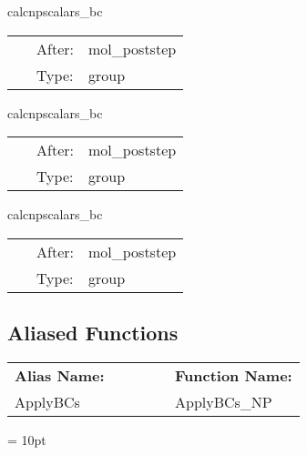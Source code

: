 \vspace{5mm}


\hspace{5mm} calcnpscalars\_bc 

\hspace{5mm}{\it boundary conditions } 


\hspace{5mm}

 \begin{tabular*}{160mm}{cll} 
~ & After:  & mol\_poststep \\ 
~ & Type:  & group \\ 
\end{tabular*} 


\vspace{5mm}


\hspace{5mm} calcnpscalars\_bc 

\hspace{5mm}{\it boundary conditions } 


\hspace{5mm}

 \begin{tabular*}{160mm}{cll} 
~ & After:  & mol\_poststep \\ 
~ & Type:  & group \\ 
\end{tabular*} 


\vspace{5mm}


\hspace{5mm} calcnpscalars\_bc 

\hspace{5mm}{\it boundary conditions } 


\hspace{5mm}

 \begin{tabular*}{160mm}{cll} 
~ & After:  & mol\_poststep \\ 
~ & Type:  & group \\ 
\end{tabular*} 


\subsection*{Aliased Functions}

\hspace{5mm}

 \begin{tabular*}{160mm}{ll} 

{\bf Alias Name:} ~~~~~~~ & {\bf Function Name:} \\ 
ApplyBCs & ApplyBCs\_NP \\ 
\end{tabular*} 



\vspace{5mm}\parskip = 10pt 

